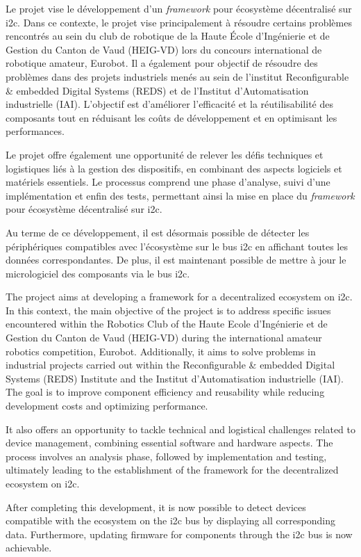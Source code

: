 Le projet vise le développement d'un \textit{framework} pour écosystème décentralisé sur \gls{i2c}.
Dans ce contexte, le projet vise principalement à résoudre certains problèmes rencontrés au sein du club de robotique de la Haute École d'Ingénierie et de Gestion du Canton de Vaud (HEIG-VD) lors du concours international de robotique amateur, Eurobot.
Il a également pour objectif de résoudre des problèmes dans des projets industriels menés au sein de l'institut Reconfigurable \& embedded Digital Systems (REDS) et de l'Institut d'Automatisation industrielle (IAI).
L'objectif est d'améliorer l'efficacité et la réutilisabilité des composants tout en réduisant les coûts de développement et en optimisant les performances.

Le projet offre également une opportunité de relever les défis techniques et logistiques liés à la gestion des dispositifs, en combinant des aspects logiciels et matériels essentiels.
Le processus comprend une phase d'analyse, suivi d'une implémentation et enfin des tests, permettant ainsi la mise en place du \textit{framework} pour écosystème décentralisé sur \gls{i2c}.

Au terme de ce développement, il est désormais possible de détecter les périphériques compatibles avec l'écosystème sur le bus \gls{i2c} en affichant toutes les données correspondantes.
De plus, il est maintenant possible de mettre à jour le micrologiciel des composants via le bus \gls{i2c}.

\asterism

The project aims at developing a framework for a decentralized ecosystem on \gls{i2c}.
In this context, the main objective of the project is to address specific issues encountered within the Robotics Club of the Haute Ecole d’Ingénierie et de Gestion du Canton de Vaud (HEIG-VD) during the international amateur robotics competition, Eurobot.
Additionally, it aims to solve problems in industrial projects carried out within the Reconfigurable \& embedded Digital Systems (REDS) Institute and the Institut d'Automatisation industrielle (IAI).
The goal is to improve component efficiency and reusability while reducing development costs and optimizing performance.

It also offers an opportunity to tackle technical and logistical challenges related to device management, combining essential software and hardware aspects.
The process involves an analysis phase, followed by implementation and testing, ultimately leading to the establishment of the framework for the decentralized ecosystem on \gls{i2c}.

After completing this development, it is now possible to detect devices compatible with the ecosystem on the \gls{i2c} bus by displaying all corresponding data.
Furthermore, updating firmware for components through the \gls{i2c} bus is now achievable.